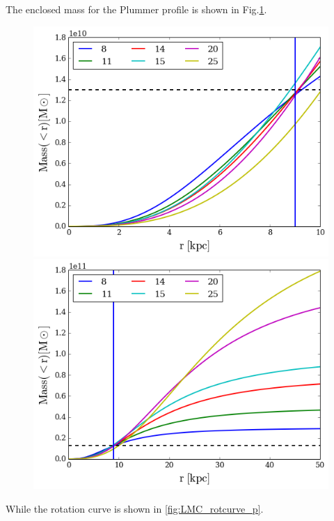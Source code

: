 The enclosed mass for the Plummer profile is shown in Fig.\ref{fig:LMC_mass_p}.


\begin{figure}[H]{\label{fig:LMC_mass_p}}
\centering
\includegraphics[scale=0.4]{LMC_mass_plummer.png}
\includegraphics[scale=0.4]{LMC_mass_plummer_out.png}
\end{figure}
While the rotation curve is shown in \ref{fig:LMC_rotcurve_p}. \\
 
